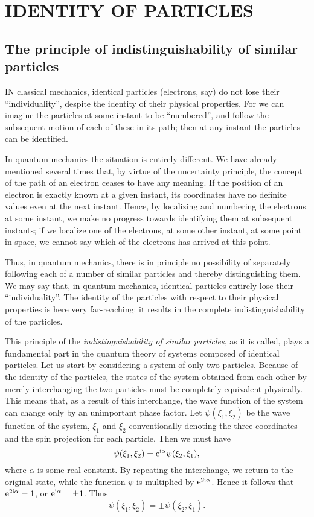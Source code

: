 \chapter{IDENTITY OF PARTICLES}\label{IDENTITY OF PARTICLES}
\section{The principle of indistinguishability of similar particles}\label{The principle of indistinguishability of similar particles}
IN classical mechanics, identical particles (electrons, say) do not lose their “individuality”, despite the identity of their physical properties. For we can imagine the particles at some instant to be “numbered”, and follow the subsequent motion of each of these in its path; then at any instant the particles can be identified.

In quantum mechanics the situation is entirely different. We have already mentioned several times that, by virtue of the uncertainty principle, the concept of the path of an electron ceases to have any meaning. If the position of an electron is exactly known at a given instant, its coordinates have no definite values even at the next instant. Hence, by localizing and numbering the electrons at some instant, we make no progress towards identifying them at subsequent instants; if we localize one of the electrons, at some other instant, at some point in space, we cannot say which of the electrons has arrived at this point.

Thus, in quantum mechanics, there is in principle no possibility of separately following each of a number of similar particles and thereby distinguishing them. We may say that, in quantum mechanics, identical particles entirely lose their “individuality”. The identity of the particles with respect to their physical properties is here very far-reaching: it results in the complete indistinguishability of the particles.

This principle of the \textit{indistinguishability of similar particles}, as it is called, plays a fundamental part in the quantum theory of systems composed of identical particles. Let us start by considering a system of only two particles. Because of the identity of the particles, the states of the system obtained from each other by merely interchanging the two particles must be completely equivalent physically. This means that, as a result of this interchange, the wave function of the system can change only by an unimportant phase factor. Let $ \psi(\xi_1,\xi_2) $ be the wave function of the system, $ \xi_1 $ and $ \xi_2 $ conventionally denoting the three coordinates and the spin projection for each particle. Then we must have
\[ \psi(\xi_1,\xi_2)=\mathrm{e}^{\mathrm{i}\alpha}\psi(\xi_2,\xi_1), \]
where $\alpha$ is some real constant. By repeating the interchange, we return to the original state, while the function $\psi$ is multiplied by $ \mathrm{e}^{2\mathrm{i}\alpha} $. Hence it follows that $ \mathrm{e}^{2\mathrm{i}\alpha}=1 $, or $ \mathrm{e}^{\mathrm{i}\alpha}=\pm1 $. Thus
\[ \psi(\xi_1,\xi_2)=\pm\psi(\xi_2,\xi_1). \]



